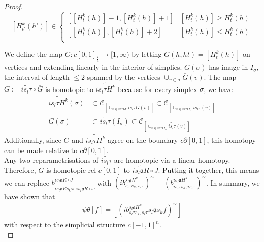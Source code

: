 \documentclass[a4paper,11pt]{article}
\theoremstyle{definition}
\theoremstyle{plain}
\theoremstyle{remark}
\begin{document}
{\begin{proof}
\[[H^k_{t'}(h')] \in \begin{cases} 
        [[H^{k}_{t}(h)]-1, [H^{k}_{t}(h)]+1]  & [H^{k}_{t}(h)]\geq H^{k}_{t}(h)\\ 
        [[H^{k}_{t}(h)], [H^{k}_{t}(h)]+2]  &  [H^{k}_{t}(h)]\leq H^{k}_{t}(h) \\
       \end{cases}
    \]

We define the map $\overline{G}: c[0,1]_{\frac{\varepsilon}{4}}\rightarrow [1,\infty)$ by letting $\overline{G}(h,ht) = [H^{k}_{t}(h)]$ on vertices and extending linearly in the interior of simplies. $\overline{G}(\sigma)$ has image in $I_{\sigma}$, the interval of length $\leq 2$ spanned by the vertices $\cup_{v\in \sigma} \overline{G}(v)$. The map $G:= \widetilde{is_{l}\tau}\circ \overline{G}$ is homotopic to $\widetilde{is_{l}\tau H^{k}}$ because for every simplex $\sigma$, we have 
\begin{align*}
\widetilde{is_{l}\tau H^{k}}(\sigma) &\subset \mathscr{C}_{[\cup_{v\in vert \sigma} \widetilde{is_{l}\tau} \overline{G}(v)]} \subset  \mathscr{C}_{[\cup_{v\in vert I_{\sigma}} \widetilde{is_{l}\tau}(v)]} \\
G(\sigma)&\subset \widetilde{is_{l}\tau} (I_{\sigma}) \subset \mathscr{C}_{[\cup_{v\in vert I_{\sigma}} \widetilde{is_{l}\tau}(v)]} 
\end{align*} 
Additionally, since $G$ and $\widetilde{is_{l}\tau H^{k}}$ agree on the boundary $c\partial[0,1]$, this homotopy can be made relative to $c\partial [0,1]$. \\

Any two reparametrisations of $\widetilde{is_{l}\tau}$ are homotopic via a linear homotopy. Therefore, $G$ is homotopic rel $c[0,1]$ to $\widetilde{i  s_{l}\mathfrak{a} R} \circ J$. Putting it together, this means we can replace $b^{\widetilde{i  s_{l}\mathfrak{a} R} \circ J}_{\widetilde{i  s_{l} \mathfrak{a} R} \widetilde{s_{k}\omega},\widetilde{i  s_{l}\mathfrak{a} R} \circ \omega}$ with $(ib^{s_{l}\mathfrak{a}H^{k}}_{s_{l}\tau s_{k},s_{l}\tau})^{\sim} = (b^{is_{l}\mathfrak{a}H^{k}}_{is_{l}\tau s_{k},is_{l}\tau})^{\sim} $. In summary, we have shown that 
\begin{align*}
\psi \theta [f] =[(i b^{s_{l}\mathfrak{a}H^{k}}_{s_{l}\tau s_{k},s_{l}\tau} s_{l}\mathfrak{a} s_{k} f)^{\sim}]
\end{align*}
with respect to the simplicial structure $c\overline{[-1,1]^n}$.\\


\end{proof}}
\end{document}
